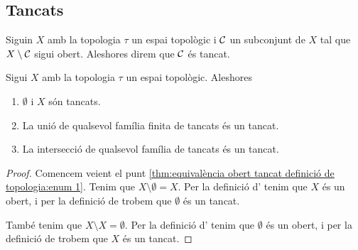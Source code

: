\documentclass[../../Main.tex]{subfiles}
\begin{document}
	\subsection{Tancats}
	\begin{definition}[Tancat]
		\label{def:tancat}
		Siguin \(X\) amb la topologia \(\tau\) un espai topològic i \(\mathcal{C}\) un subconjunt de \(X\) tal que \(X\setminus\mathcal{C}\) sigui obert. Aleshores direm que \(\mathcal{C}\) és tancat.
	\end{definition}
	\begin{theorem}
		\label{thm:equivalència obert tancat definició de topologia}
		Sigui \(X\) amb la topologia \(\tau\) un espai topològic. Aleshores
		\begin{enumerate}
			\item\label{thm:equivalència obert tancat definició de topologia:enum 1} \(\emptyset\) i \(X\) són tancats.
			\item\label{thm:equivalència obert tancat definició de topologia:enum 2} La unió de qualsevol família finita de tancats és un tancat.
			\item\label{thm:equivalència obert tancat definició de topologia:enum 3} La intersecció de qualsevol família de tancats és un tancat.
		\end{enumerate}
		\begin{proof}
			Comencem veient el punt \eqref{thm:equivalència obert tancat definició de topologia:enum 1}. Tenim que \(X\setminus\emptyset=X\). Per la definició d' tenim que \(X\) és un obert, i per la definició de  trobem que \(\emptyset\) és un tancat.
			
			També tenim que \(X\setminus X=\emptyset\). Per la definició d' tenim que \(\emptyset\) és un obert, i per la definició de  trobem que \(X\) és un tancat.
			

\end{proof}
\end{theorem}
\end{document}
